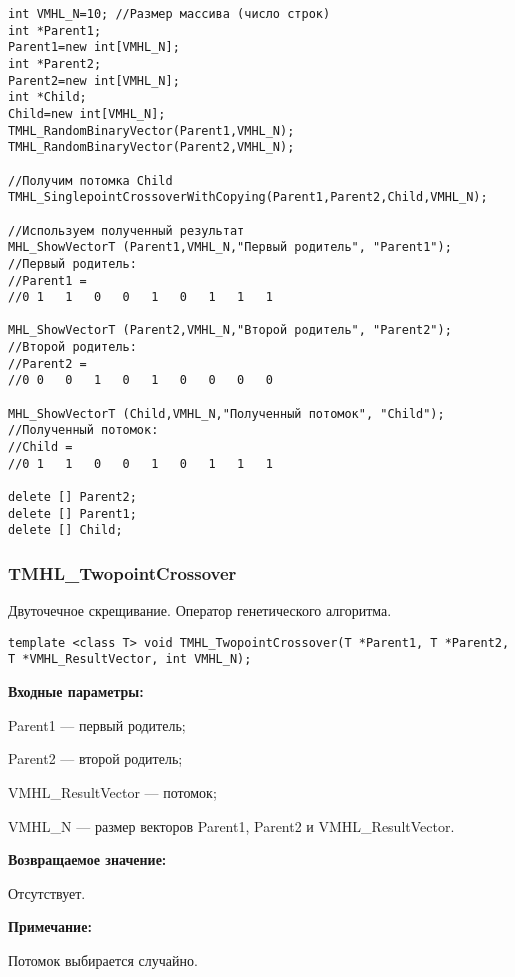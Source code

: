 \documentclass[a4paper,12pt]{article}
\begin{document}
\begin{lstlisting}[label=code_use_TMHL_SinglepointCrossoverWithCopying,caption=Пример использования]
int VMHL_N=10; //Размер массива (число строк)
int *Parent1;
Parent1=new int[VMHL_N];
int *Parent2;
Parent2=new int[VMHL_N];
int *Child;
Child=new int[VMHL_N];
TMHL_RandomBinaryVector(Parent1,VMHL_N);
TMHL_RandomBinaryVector(Parent2,VMHL_N);

//Получим потомка Child
TMHL_SinglepointCrossoverWithCopying(Parent1,Parent2,Child,VMHL_N);

//Используем полученный результат
MHL_ShowVectorT (Parent1,VMHL_N,"Первый родитель", "Parent1");
//Первый родитель:
//Parent1 =	
//0	1	1	0	0	1	0	1	1	1

MHL_ShowVectorT (Parent2,VMHL_N,"Второй родитель", "Parent2");
//Второй родитель:
//Parent2 =	
//0	0	0	1	0	1	0	0	0	0

MHL_ShowVectorT (Child,VMHL_N,"Полученный потомок", "Child");
//Полученный потомок:
//Child =	
//0	1	1	0	0	1	0	1	1	1

delete [] Parent2;
delete [] Parent1;
delete [] Child;
\end{lstlisting}

\subsubsection{TMHL\_TwopointCrossover}\label{TMHL_TwopointCrossover}

Двуточечное скрещивание. Оператор генетического алгоритма.


\begin{lstlisting}[label=code_syntax_TMHL_TwopointCrossover,caption=Синтаксис]
template <class T> void TMHL_TwopointCrossover(T *Parent1, T *Parent2, T *VMHL_ResultVector, int VMHL_N);
\end{lstlisting}

\textbf{Входные параметры:}
 
 Parent1 --- первый родитель;
 
 Parent2 --- второй родитель;
 
 VMHL\_ResultVector --- потомок;
 
 VMHL\_N --- размер векторов Parent1, Parent2 и VMHL\_ResultVector.

\textbf{Возвращаемое значение:}

 Отсутствует.
 
\textbf{ Примечание:}

 Потомок выбирается случайно.
 
\end{document}
